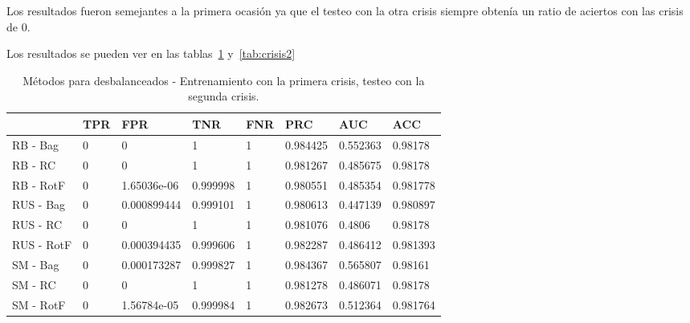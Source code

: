 Los resultados fueron semejantes a la primera ocasión ya que el testeo con la otra crisis siempre obtenía un ratio de aciertos con las crisis de 0.

Los resultados se pueden ver en las tablas~\ref{tab:crisis1} y~\ref{tab:crisis2}

\begin{table}\scriptsize
	\begin{center}
		\begin{tabular}{llllllll}
			\toprule
			{} & TPR &          FPR &       TNR & FNR &       PRC &       AUC &       ACC \\
			\midrule
			RB - Bag                &   0 &            0 &         1 &   1 &  0.984425 &  0.552363 &   0.98178 \\
			RB - RC       &   0 &            0 &         1 &   1 &  0.981267 &  0.485675 &   0.98178 \\
			RB - RotF        &   0 &  1.65036e-06 &  0.999998 &   1 &  0.980551 &  0.485354 &  0.981778 \\
			RUS - Bag          &   0 &  0.000899444 &  0.999101 &   1 &  0.980613 &  0.447139 &  0.980897 \\
			RUS - RC &   0 &            0 &         1 &   1 &  0.981076 &    0.4806 &   0.98178 \\
			RUS - RotF  &   0 &  0.000394435 &  0.999606 &   1 &  0.982287 &  0.486412 &  0.981393 \\
			SM - Bag                         &   0 &  0.000173287 &  0.999827 &   1 &  0.984367 &  0.565807 &   0.98161 \\
			SM - RC                &   0 &            0 &         1 &   1 &  0.981278 &  0.486071 &   0.98178 \\
			SM - RotF                 &   0 &  1.56784e-05 &  0.999984 &   1 &  0.982673 &  0.512364 &  0.981764 \\
			\bottomrule
		\end{tabular}
		\caption{Métodos para desbalanceados - Entrenamiento con la primera crisis, testeo con la segunda crisis.}
		\label{tab:crisis1}
	\end{center}
\end{table}

